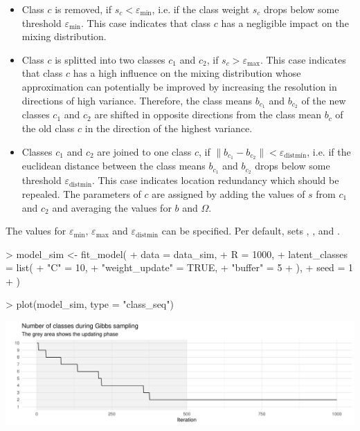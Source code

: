 \documentclass[article]{jss}
\begin{document}
\begin{itemize}
  \item Class $c$ is removed, if $s_c<\varepsilon_{\text{min}}$, i.e. if the class weight $s_c$ drops below some threshold $\varepsilon_{\text{min}}$. This case indicates that class $c$ has a negligible impact on the mixing distribution.
  \item Class $c$ is splitted into two classes $c_1$ and $c_2$, if $s_c>\varepsilon_\text{max}$. This case indicates that class $c$ has a high influence on the mixing distribution whose approximation can potentially be improved by increasing the resolution in directions of high variance. Therefore, the class means $b_{c_1}$ and $b_{c_2}$ of the new classes $c_1$ and $c_2$ are shifted in opposite directions from the class mean $b_c$ of the old class $c$ in the direction of the highest variance.
  \item Classes $c_1$ and $c_2$ are joined to one class $c$, if $\lVert b_{c_1} - b_{c_2} \rVert<\varepsilon_{\text{distmin}}$, i.e. if the euclidean distance between the class means $b_{c_1}$ and $b_{c_2}$  drops below some threshold $\varepsilon_{\text{distmin}}$. This case indicates location redundancy which should be repealed. The parameters of $c$ are assigned by adding the values of $s$ from $c_1$ and $c_2$ and averaging the values for $b$ and $\Omega$.
\end{itemize}

The values for $\varepsilon_{\text{min}}$, $\varepsilon_{\text{max}}$ and $\varepsilon_{\text{distmin}}$ can be specified. Per default,  sets  , , and .

\begin{Schunk}
\begin{Sinput}
> model_sim <- fit_model(
+    data = data_sim,
+    R = 1000,
+    latent_classes = list(
+      "C" = 10,
+      "weight_update" = TRUE,
+      "buffer" = 5
+      ),
+    seed = 1
+  )
\end{Sinput}
\end{Schunk}

\begin{Schunk}
\begin{Sinput}
> plot(model_sim, type = "class_seq")
\end{Sinput}
\end{Schunk}
\includegraphics{rprobitb_oelschlaeger_bauer-model-sim-class-seq}
\end{document}
